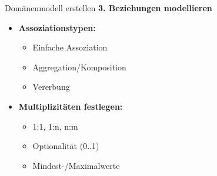 \begin{KR}{Domänenmodell erstellen}
\textbf{3. Beziehungen modellieren}
\begin{itemize}
    \item \textbf{Assoziationstypen:}
    \begin{itemize}
        \item Einfache Assoziation
        \item Aggregation/Komposition
        \item Vererbung
    \end{itemize}
    
    \item \textbf{Multiplizitäten festlegen:}
    \begin{itemize}
        \item 1:1, 1:n, n:m
        \item Optionalität (0..1)
        \item Mindest-/Maximalwerte
    \end{itemize}
\end{itemize}
\end{KR}

